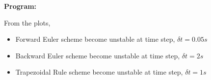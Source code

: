 \documentclass[a4paper,11pt]{report}
\begin{document}
\begin{enumerate}
\begin{enumerate}
    \end{enumerate}

    \vspace{0.5 cm}

    \textbf{Program:}
    

    \vspace{1 cm}

    From the plots, 
    \begin{itemize}
    \item Forward Euler scheme become unstable at time step, $\delta t = 0.05s$
    \item Backward Euler scheme become unstable at time step, $\delta t = 2s$
    \item Trapezoidal Rule scheme become unstable at time step, $\delta t = 1s$
    \end{itemize}

    \begin{figure}[ht!]
    \centering
    \resizebox{0.95\linewidth}{!}{}
    \end{figure}

    \begin{figure}[ht!]
    \centering
    \resizebox{0.95\linewidth}{!}{}
    \end{figure}

    \begin{figure}[ht!]
    \centering
    \resizebox{0.95\linewidth}{!}{}
    \end{figure}

    \begin{figure}[ht!]
    \centering
    \resizebox{0.95\linewidth}{!}{}
    \end{figure}
    
    \begin{figure}[ht!]
    \centering
    \resizebox{0.95\linewidth}{!}{}
    \end{figure}

    \begin{figure}[ht!]
    \centering
    \resizebox{0.95\linewidth}{!}{}
    \end{figure}

    \begin{figure}[ht!]
    \centering
    \resizebox{0.95\linewidth}{!}{}
    \end{figure}


\end{enumerate}
\end{document}
